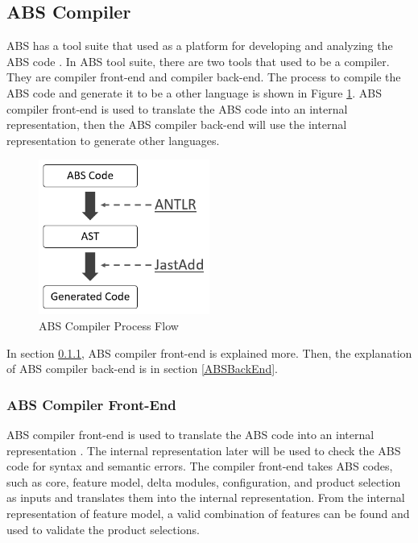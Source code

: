 \subsection{ABS Compiler}\label{ABSCompiler}
ABS has a tool suite that used as a platform for developing and analyzing the ABS code \citep{paper.wong.abstools}. In ABS tool suite, there are two tools that used to be a compiler. They are compiler front-end and compiler back-end. The process to compile the ABS code and generate it to be a other language is shown in Figure \ref{fig:ABScompilerFlow}. ABS compiler front-end is used to translate the ABS code into an internal representation, then the ABS compiler back-end will use the internal representation to generate other languages.

\begin{figure}
	\centering
	\includegraphics[width=0.5\textwidth]
	{pics/ABScompilerFlow.png}
	\caption{ABS Compiler Process Flow}
	\label{fig:ABScompilerFlow}
\end{figure}

In section \ref{ABSFrontEnd}, ABS compiler front-end is explained more. Then, the explanation of ABS compiler back-end is in section \ref{ABSBackEnd}.  

\subsubsection{ABS Compiler Front-End}\label{ABSFrontEnd}
ABS compiler front-end is used to translate the ABS code into an internal representation \citep{paper.wong.abstools}. The internal representation later will be used to check the ABS code for syntax and semantic errors. The compiler front-end takes ABS codes, such as core, feature model, delta modules, configuration, and product selection as inputs and translates them into the internal representation. From the internal representation of feature model, a valid combination of features can be found and used to validate the product selections.

